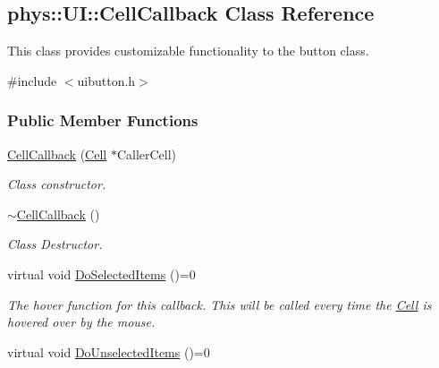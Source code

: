 \hypertarget{classphys_1_1UI_1_1CellCallback}{
\subsection{phys::UI::CellCallback Class Reference}
\label{classphys_1_1UI_1_1CellCallback}
}


This class provides customizable functionality to the button class.  




{\ttfamily \#include $<$uibutton.h$>$}

\subsubsection*{Public Member Functions}
\begin{DoxyCompactItemize}
\item 
\hyperlink{classphys_1_1UI_1_1CellCallback_aec625f93fd825617c7e265f5529516ba}{CellCallback} (\hyperlink{classphys_1_1UI_1_1Cell}{Cell} $\ast$CallerCell)
\begin{DoxyCompactList}\small\item\em Class constructor. \item\end{DoxyCompactList}\item 
\hypertarget{classphys_1_1UI_1_1CellCallback_a15a79254993a90a50e7c6efe60a2089a}{
\hyperlink{classphys_1_1UI_1_1CellCallback_a15a79254993a90a50e7c6efe60a2089a}{$\sim$CellCallback} ()}
\label{classphys_1_1UI_1_1CellCallback_a15a79254993a90a50e7c6efe60a2089a}

\begin{DoxyCompactList}\small\item\em Class Destructor. \item\end{DoxyCompactList}\item 
\hypertarget{classphys_1_1UI_1_1CellCallback_a7412178ba0954b416418f1ba574957b4}{
virtual void \hyperlink{classphys_1_1UI_1_1CellCallback_a7412178ba0954b416418f1ba574957b4}{DoSelectedItems} ()=0}
\label{classphys_1_1UI_1_1CellCallback_a7412178ba0954b416418f1ba574957b4}

\begin{DoxyCompactList}\small\item\em The hover function for this callback. This will be called every time the \hyperlink{classphys_1_1UI_1_1Cell}{Cell} is hovered over by the mouse. \item\end{DoxyCompactList}\item 
\hypertarget{classphys_1_1UI_1_1CellCallback_ae395358b35ba72c7195e1b2704543fb1}{
virtual void \hyperlink{classphys_1_1UI_1_1CellCallback_ae395358b35ba72c7195e1b2704543fb1}{DoUnselectedItems} ()=0}
\label{classphys_1_1UI_1_1CellCallback_ae395358b35ba72c7195e1b2704543fb1}


\end{DoxyCompactItemize}
